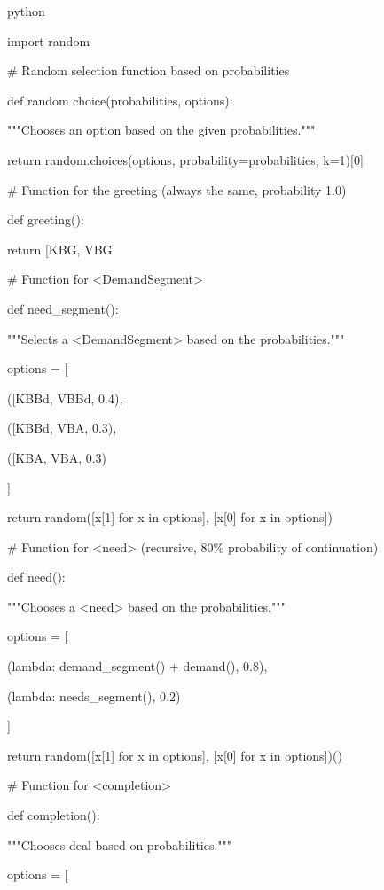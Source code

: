 \documentclass[
]{article}
\begin{document}
python

import random

\# Random selection function based on probabilities

def random choice(probabilities, options):

"""Chooses an option based on the given probabilities."""

return random.choices(options, probability=probabilities, k=1){[}0{]}

\# Function for the greeting (always the same, probability 1.0)

def greeting():

return {[}\textquotesingle KBG\textquotesingle,
\textquotesingle VBG\textquotesingle{]}

\# Function for \textless DemandSegment\textgreater{}

def need\_segment():

"""Selects a \textless DemandSegment\textgreater{} based on the
probabilities."""

options = {[}

({[}\textquotesingle KBBd\textquotesingle,
\textquotesingle VBBd\textquotesingle{]}, 0.4),

({[}\textquotesingle KBBd\textquotesingle,
\textquotesingle VBA\textquotesingle{]}, 0.3),

({[}\textquotesingle KBA\textquotesingle,
\textquotesingle VBA\textquotesingle{]}, 0.3)

{]}

return random({[}x{[}1{]} for x in options{]}, {[}x{[}0{]} for x in
options{]})

\# Function for \textless need\textgreater{} (recursive, 80\%
probability of continuation)

def need():

"""Chooses a \textless need\textgreater{} based on the probabilities."""

options = {[}

(lambda: demand\_segment() + demand(), 0.8),

(lambda: needs\_segment(), 0.2)

{]}

return random({[}x{[}1{]} for x in options{]}, {[}x{[}0{]} for x in
options{]})()

\# Function for \textless completion\textgreater{}

def completion():

"""Chooses deal based on probabilities."""

options = {[}
\end{document}

